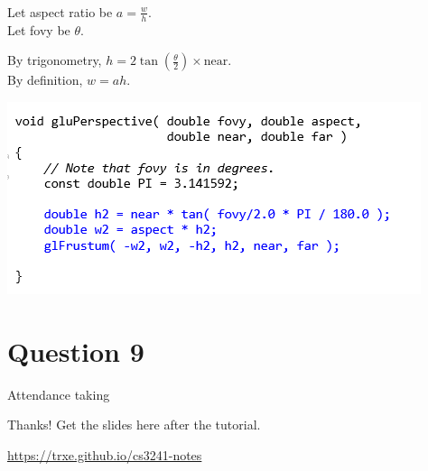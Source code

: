 \documentclass{beamer}
\begin{document}
\begin{frame}
    \frametitle{}
    Let aspect ratio be $a = \frac{w}{h}$.\\
    Let fovy be $\theta$.\\

    \vspace{1em}

    By trigonometry, $h = 2\tan(\frac{\theta}{2}) \times \text{near}$.\\
    By definition, $w = ah$.

    \vspace{1em}

    \begin{center}
        \includegraphics[scale=0.8]{q8-ans.png}
    \end{center}

\end{frame}

\section{Question 9}

\begin{frame}
    \AlegreyaExtraBold \LARGE
    Attendance taking
\end{frame}

\begin{frame}
    Thanks! Get the slides here after the tutorial.\\
    \vspace{2em}
    \scalebox{3}{\faGithub}\par\bigskip
    \url{https://trxe.github.io/cs3241-notes}
\end{frame}
\end{document}
